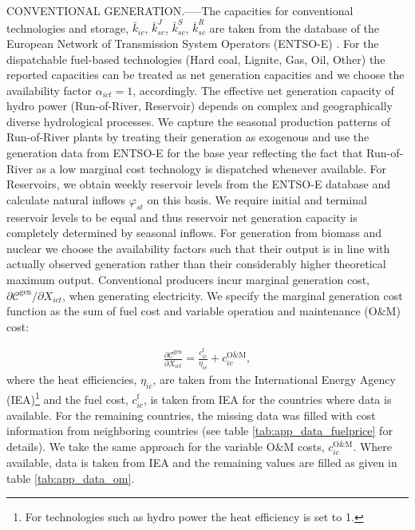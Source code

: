 \documentclass[authoryear]{elsarticle}
\begin{document}
\footnotesize\MakeUppercase{Conventional Generation}.-----\normalsize The capacities for conventional technologies and storage, $\bar{k}_{ic}$, $\bar{k}_{sc}^J$, $\bar{k}_{sc}^S$, $\bar{k}_{sc}^R$ are taken from the database of the European Network of Transmission System Operators (ENTSO-E) \cite{entsoe-cap}. For the dispatchable fuel-based technologies (Hard coal, Lignite, Gas, Oil, Other) the reported capacities can be treated as net generation capacities and we choose the availability factor $\alpha_{ict} = 1$, accordingly. The effective net generation capacity of hydro power (Run-of-River, Reservoir) depends on complex and geographically diverse hydrological processes. We capture the seasonal production patterns of Run-of-River plants by treating their generation as exogenous and use the generation data from ENTSO-E for the base year\cite{entsoe-generation} reflecting the fact that Run-of-River as a low marginal cost technology is dispatched whenever available. For Reservoirs, we obtain weekly reservoir levels from the ENTSO-E database\cite{entsoe-generation} and calculate natural inflows $\varphi_{st}$ on this basis. We require initial and terminal reservoir levels to be equal and thus reservoir net generation capacity is completely determined by seasonal inflows. For generation from biomass and nuclear we choose the availability factors such that their output is in line with actually observed generation rather than their considerably higher theoretical maximum output. Conventional producers incur marginal generation cost, $\partial \mathcal{C}^\mathrm{gen}/\partial X_{ict}$, when generating electricity. We specify the marginal generation cost function as the sum of fuel cost and variable operation and maintenance (O\&M) cost:

\begin{align}
\frac{\partial \mathcal{C}^\mathrm{gen}}{\partial X_{ict}} = \frac{c^\mathrm{f}_{ic}}{\eta_{ic}} + c^\mathrm{O\&M}_{ic}, 
\label{eq:marg_gen}
\end{align} 
where the heat efficiencies, $\eta_{ic}$, are taken from the International Energy Agency (IEA)\cite{IEA2015}\footnote{For technologies such as hydro power the heat efficiency is set to 1.} and the fuel cost, $c^\mathrm{f}_{ic}$, is taken from IEA\cite{IEA2019} for the countries where data is available. For the remaining countries, the missing data was filled with cost information from neighboring countries (see table \ref{tab:app_data_fuelprice} for details). We take the same approach for the variable O\&M costs, $c^\mathrm{O\&M}_{ic}$. Where available, data is taken from IEA\cite{IEA2015} and the remaining values are filled as given in table \ref{tab:app_data_om}. 
\end{document}
